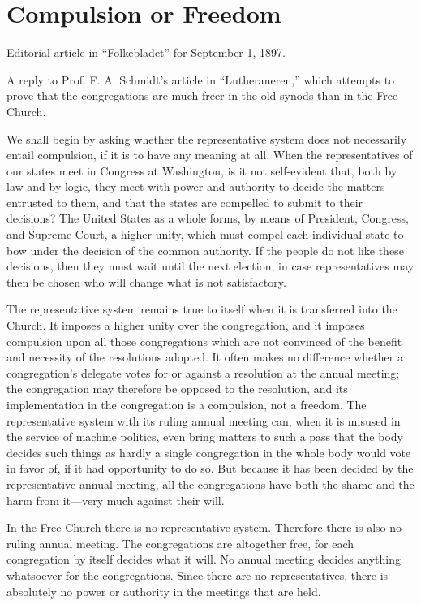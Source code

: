 
\section{Compulsion or Freedom}

Editorial article in “Folkebladet” for September 1, 1897.

A reply to Prof. F. A. Schmidt’s article in “Lutheraneren,” which attempts to prove that the congregations are much freer in the old synods than in the Free Church.

We shall begin by asking whether the representative system does not necessarily entail compulsion, if it is to have any meaning at all. When the representatives of our states meet in Congress at Washington, is it not self-evident that, both by law and by logic, they meet with power and authority to decide the matters entrusted to them, and that the states are compelled to submit to their decisions? The United States as a whole forms, by means of President, Congress, and Supreme Court, a higher unity, which must compel each individual state to bow under the decision of the common authority. If the people do not like these decisions, then they must wait until the next election, in case representatives may then be chosen who will change what is not satisfactory.

The representative system remains true to itself when it is transferred into the Church. It imposes a higher unity over the congregation, and it imposes compulsion upon all those congregations which are not convinced of the benefit and necessity of the resolutions adopted. It often makes no difference whether a congregation’s delegate votes for or against a resolution at the annual meeting; the congregation may therefore be opposed to the resolution, and its implementation in the congregation is a compulsion, not a freedom. The representative system with its ruling annual meeting can, when it is misused in the service of machine politics, even bring matters to such a pass that the body decides such things as hardly a single congregation in the whole body would vote in favor of, if it had opportunity to do so. But because it has been decided by the representative annual meeting, all the congregations have both the shame and the harm from it—very much against their will.

In the Free Church there is no representative system. Therefore there is also no ruling annual meeting. The congregations are altogether free, for each congregation by itself decides what it will. No annual meeting decides anything whatsoever for the congregations. Since there are no representatives, there is absolutely no power or authority in the meetings that are held.

